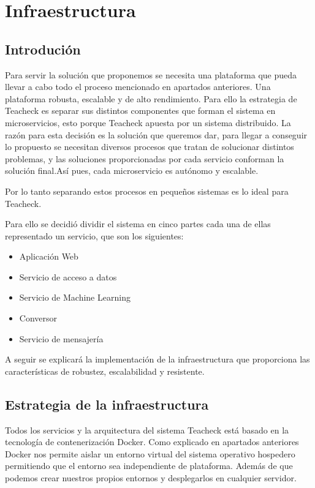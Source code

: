 \chapter{Infraestructura}

\section{Introdución}
Para servir la solución que proponemos se necesita una plataforma que
pueda llevar a cabo todo el proceso mencionado en apartados
anteriores. Una plataforma robusta, escalable y de alto
rendimiento. Para ello la estrategia de Teacheck es separar sus
distintos componentes que forman el sistema en microservicios, esto
porque Teacheck apuesta por un sistema distribuido. La razón para esta
decisión es la solución que queremos dar, para llegar a conseguir lo
propuesto se necesitan diversos procesos que tratan de solucionar
distintos problemas, y las soluciones proporcionadas por cada servicio
conforman la solución final.Así pues, cada microservicio es autónomo y
escalable.

Por lo tanto separando estos procesos en pequeños sistemas es lo ideal
para Teacheck.

Para ello se decidió dividir el sistema en cinco partes cada una de
ellas representado un servicio, que son los siguientes:
\begin{itemize}
\item{Aplicación Web}
\item{Servicio de acceso a datos}
\item{Servicio de Machine Learning}
\item{Conversor}
\item{Servicio de mensajería}
\end{itemize}

A seguir se explicará la implementación de la infraestructura que
proporciona las características de robustez, escalabilidad y
resistente.
\section{Estrategia de la infraestructura}

Todos los servicios y la arquitectura del sistema Teacheck está basado
en la tecnología de contenerización Docker. Como explicado en
apartados anteriores Docker nos permite aislar un entorno virtual del
sistema operativo hospedero permitiendo que el entorno sea
independiente de plataforma. Además de que podemos crear nuestros
propios entornos y desplegarlos en cualquier servidor.

